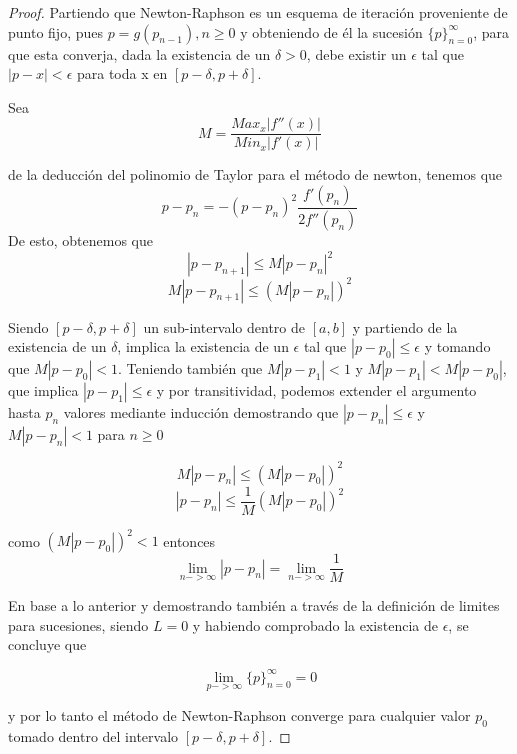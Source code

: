 \begin{proof}
Partiendo que Newton-Raphson es un esquema de iteración proveniente de punto fijo\cite{atkinson}, pues $p = g(p_{n-1}), n \geq 0$ y obteniendo de él la sucesión $\{p\}^\infty_{n=0}$, para que esta converja, dada la existencia de un  $\delta > 0$, debe existir un $\epsilon$ tal que $|p - x| < \epsilon$ para toda x en  $[p-\delta, p+\delta]$.

Sea 
\begin{displaymath}
M = \frac{Max_{x}|f''(x)|}{Min_{x}|f'(x)|}
\end{displaymath}

de la deducción del polinomio de Taylor para el método de newton, tenemos que 
\begin{displaymath}
 p - p_n = - (p-p_n)^2\frac{f'(p_n)}{2f''(p_n)}
\end{displaymath}
De esto, obtenemos que 
\begin{displaymath}
| p - p_{n+1}| \leq M|p - p_n|^2
\end{displaymath}
\begin{displaymath}
M| p - p_{n+1}| \leq (M|p - p_n|)^2
\end{displaymath}

Siendo $[p-\delta, p+\delta]$ un sub-intervalo dentro de $[a,b]$ y partiendo de la existencia de un $\delta$, implica la existencia de un $\epsilon$ tal que $| p - p_0| \leq \epsilon$  y tomando que $M| p - p_0| < 1$. Teniendo también que $M| p - p_1| < 1$ y $M| p - p_1| < M| p - p_0|$, que implica $| p - p_1| \leq \epsilon$ y por transitividad, podemos extender el argumento hasta $p_n$ valores mediante inducción demostrando que  $| p - p_n| \leq \epsilon$  y  $M| p - p_n| < 1$ para $n \geq 0$

\begin{displaymath}
M| p - p_{n}| \leq (M|p - p_0|)^2
\end{displaymath}
\begin{displaymath}
| p - p_{n}| \leq \frac{1}{M}(M|p - p_0|)^2
\end{displaymath}

como $(M|p - p_0|)^2 < 1$ entonces 
\begin{displaymath}
\lim_{n->\infty}{| p - p_{n}|} = \lim_{n->\infty}{\frac{1}{M}}
\end{displaymath}


En base a lo anterior y demostrando también a través de la definición de limites para sucesiones, siendo $L = 0$ y habiendo comprobado la existencia de $\epsilon$, se concluye que

\begin{displaymath}
\lim_{p->\infty}{\{p\}^\infty_{n=0}} = 0
\end{displaymath}

y por lo tanto el método de Newton-Raphson converge para cualquier valor $p_0$ tomado dentro del intervalo $[p-\delta, p+\delta]$.

\end{proof}

